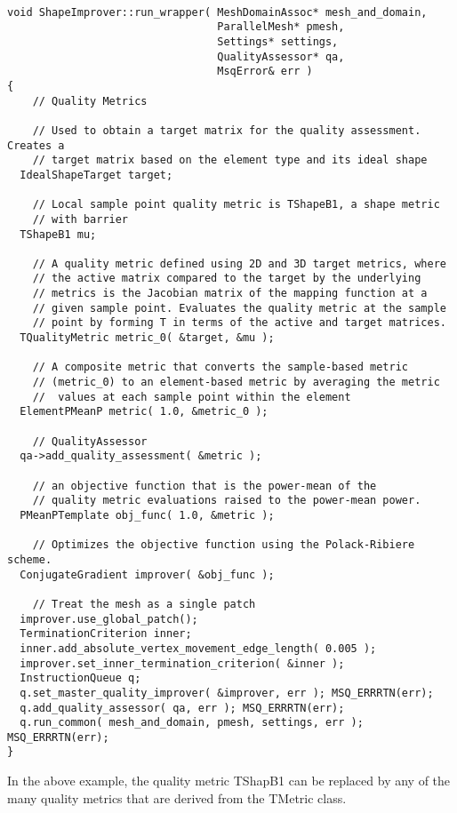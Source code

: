 \begin{lstlisting}[frame=single]

void ShapeImprover::run_wrapper( MeshDomainAssoc* mesh_and_domain,
                                 ParallelMesh* pmesh,
                                 Settings* settings,
                                 QualityAssessor* qa,
                                 MsqError& err )
{
    // Quality Metrics

    // Used to obtain a target matrix for the quality assessment. Creates a
    // target matrix based on the element type and its ideal shape
  IdealShapeTarget target;

    // Local sample point quality metric is TShapeB1, a shape metric 
    // with barrier
  TShapeB1 mu;

    // A quality metric defined using 2D and 3D target metrics, where 
    // the active matrix compared to the target by the underlying 
    // metrics is the Jacobian matrix of the mapping function at a 
    // given sample point. Evaluates the quality metric at the sample
    // point by forming T in terms of the active and target matrices.
  TQualityMetric metric_0( &target, &mu );

    // A composite metric that converts the sample-based metric 
    // (metric_0) to an element-based metric by averaging the metric
    //  values at each sample point within the element
  ElementPMeanP metric( 1.0, &metric_0 );

    // QualityAssessor
  qa->add_quality_assessment( &metric );
    
    // an objective function that is the power-mean of the 
    // quality metric evaluations raised to the power-mean power.
  PMeanPTemplate obj_func( 1.0, &metric );

    // Optimizes the objective function using the Polack-Ribiere scheme.
  ConjugateGradient improver( &obj_func );

    // Treat the mesh as a single patch
  improver.use_global_patch();
  TerminationCriterion inner;
  inner.add_absolute_vertex_movement_edge_length( 0.005 );
  improver.set_inner_termination_criterion( &inner );
  InstructionQueue q;
  q.set_master_quality_improver( &improver, err ); MSQ_ERRRTN(err);
  q.add_quality_assessor( qa, err ); MSQ_ERRRTN(err);
  q.run_common( mesh_and_domain, pmesh, settings, err ); MSQ_ERRRTN(err);
}

\end{lstlisting}

In the above example, the quality metric TShapB1 can be replaced by any of the many quality metrics that are derived from the TMetric class.

